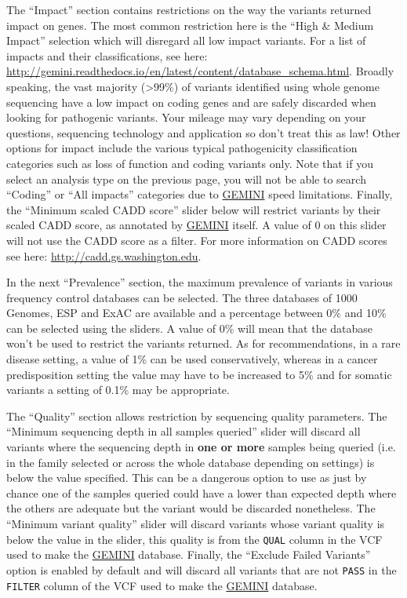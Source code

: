 \documentclass[11pt, a4paper]{article}
\newcommand{\GEMINI}{\href{https://gemini.readthedocs.io}{GEMINI} } %
\begin{document}
The ``Impact'' section contains restrictions on the way the variants returned impact on genes. The most common restriction here is the ``High \& Medium Impact'' selection which will disregard all low impact variants. For a list of impacts and their classifications, see here: \url{http://gemini.readthedocs.io/en/latest/content/database_schema.html}. Broadly speaking, the vast majority (>99\%) of variants identified using whole genome sequencing have a low impact on coding genes and are safely discarded when looking for pathogenic variants. Your mileage may vary depending on your questions, sequencing technology and application so don't treat this as law! Other options for impact include the various typical pathogenicity classification categories such as loss of function and coding variants only. Note that if you select an analysis type on the previous page, you will not be able to search ``Coding'' or ``All impacts'' categories due to \GEMINI speed limitations. Finally, the ``Minimum scaled CADD score'' slider below will restrict variants by their scaled CADD score, as annotated by \GEMINI itself. A value of 0 on this slider will not use the CADD score as a filter. For more information on CADD scores see here: \url{http://cadd.gs.washington.edu}. 

In the next ``Prevalence'' section, the maximum prevalence of variants in various frequency control databases can be selected. The three databases of 1000 Genomes, ESP and ExAC are available and a percentage between 0\% and 10\% can be selected using the sliders. A value of 0\% will mean that the database won't be used to restrict the variants returned. As for recommendations, in a rare disease setting, a value of 1\% can be used conservatively, whereas in a cancer predisposition setting the value may have to be increased to 5\% and for somatic variants a setting of 0.1\% may be appropriate.

The ``Quality'' section allows restriction by sequencing quality parameters. The ``Minimum sequencing depth in all samples queried'' slider will discard all variants where the sequencing depth in \textbf{one or more} samples being queried (i.e. in the family selected or across the whole database depending on settings) is below the value specified. This can be a dangerous option to use as just by chance one of the samples queried could have a lower than expected depth where the others are adequate but the variant would be discarded nonetheless. The ``Minimum variant quality'' slider will discard variants whose variant quality is below the value in the slider, this quality is from the \texttt{QUAL} column in the VCF used to make the \GEMINI database. Finally, the ``Exclude Failed Variants'' option is enabled by default and will discard all variants that are not \texttt{PASS} in the \texttt{FILTER} column of the VCF used to make the \GEMINI database.
\end{document}
